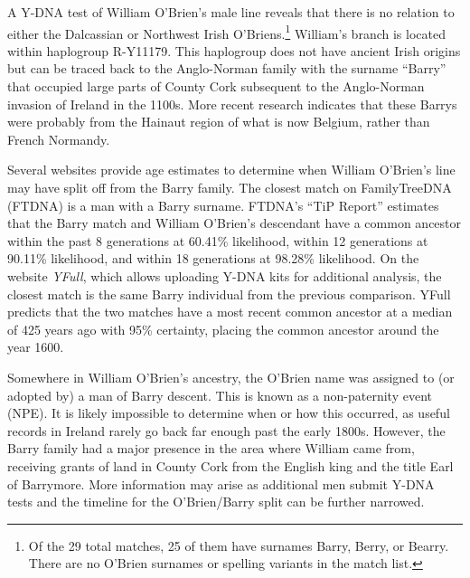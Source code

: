 A Y-DNA test of William O'Brien's male line\cite{BigY} reveals that there is no relation to either the Dalcassian or Northwest Irish O'Briens.\footnote{Of the 29 total matches, 25 of them have surnames Barry, Berry, or Bearry. There are no O'Brien surnames or spelling variants in the match list.} William's branch is located within haplogroup R-Y11179. This haplogroup does not have ancient Irish origins but can be traced back to the Anglo-Norman family with the surname ``Barry'' that occupied large parts of County Cork subsequent to the Anglo-Norman invasion of Ireland in the 1100s.\cite{BarrymoreDNA:9} More recent research indicates that these Barrys were probably from the Hainaut region of what is now Belgium, rather than French Normandy.\cite{BarrymoreDNA:2-4}

Several websites provide age estimates to determine when William O'Bri\-en's line may have split off from the Barry family. The closest match on FamilyTreeDNA (FTDNA) is a man with a Barry surname. FTDNA's ``TiP Report'' estimates that the Barry match and William O'Brien's descendant have a common ancestor within the past 8 generations at 60.41\% likelihood, within 12 generations at 90.11\% likelihood, and within 18 generations at 98.28\% likelihood.\cite{TiP} On the website \textit{YFull}, which allows uploading Y-DNA kits for additional analysis, the closest match is the same Barry individual from the previous comparison. YFull predicts that the two matches have a most recent common ancestor at a median of 425 years ago with 95\% certainty, placing the common ancestor around the year 1600.\cite{YFull}

Somewhere in William O'Brien's ancestry, the O'Brien name was assigned to (or adopted by) a man of Barry descent. This is known as a non-paternity event (NPE). It is likely impossible to determine when or how this occurred, as useful records in Ireland rarely go back far enough past the early 1800s. However, the Barry family had a major presence in the area where William came from, receiving grants of land in County Cork from the English king and the title Earl of Barrymore.\cite{BarrymoreDNA:4} More information may arise as additional men submit Y-DNA tests and the timeline for the O'Brien/Barry split can be further narrowed.

